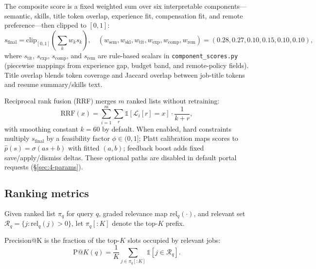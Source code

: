 The composite score is a fixed weighted sum over six interpretable components---semantic, skills, title token overlap, experience fit, compensation fit, and remote preference---then clipped to $[0,1]$:
\begin{equation}
  s_{\mathrm{final}} =
    \mathrm{clip}_{[0,1]}\!\left(
    \sum_{k} w_k s_k
    \right), \quad
    (w_{\mathrm{sem}}, w_{\mathrm{skl}}, w_{\mathrm{tit}}, w_{\mathrm{exp}}, w_{\mathrm{comp}}, w_{\mathrm{rem}})
    = (0.28, 0.27, 0.10, 0.15, 0.10, 0.10),
  \label{eq:composite}
\end{equation}
where $s_{\mathrm{tit}}$, $s_{\mathrm{exp}}$, $s_{\mathrm{comp}}$, and $s_{\mathrm{rem}}$ are rule-based scalars in \texttt{component\_scores.py} (piecewise mappings from experience gap, budget band, and remote-policy fields).
Title overlap blends token coverage and Jaccard overlap between job-title tokens and resume summary/skills text.

Reciprocal rank fusion (RRF) merges $m$ ranked lists without retraining:
\begin{equation}
  \mathrm{RRF}(x) = \sum_{i=1}^{m} \sum_{r} \mathbb{1}[\mathcal{L}_i[r] = x] \cdot \frac{1}{k + r},
  \label{eq:rrf}
\end{equation}
with smoothing constant $k{=}60$ by default.
When enabled, hard constraints multiply $s_{\mathrm{final}}$ by a feasibility factor $\phi \in (0,1]$; Platt calibration maps scores to $\hat{p}(s)=\sigma(a s + b)$ with fitted $(a,b)$; feedback boost adds fixed save/apply/dismiss deltas.
These optional paths are disabled in default portal requests (\S\ref{sec:4-params}).

\subsection{Ranking metrics}\label{sec:5-ranking}

Given ranked list $\pi_q$ for query $q$, graded relevance map $\mathrm{rel}_q(\cdot)$, and relevant set $\mathcal{R}_q = \{ j : \mathrm{rel}_q(j) > 0 \}$, let $\pi_q[:K]$ denote the top-$K$ prefix.

Precision@K is the fraction of the top-$K$ slots occupied by relevant jobs:
\begin{equation}
  \mathrm{P@}K(q) = \frac{1}{K}\sum_{j \in \pi_q[:K]} \mathbb{1}[j \in \mathcal{R}_q].
  \label{eq:p-at-k}
\end{equation}

